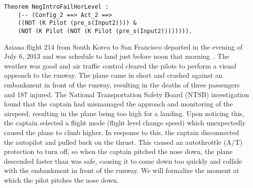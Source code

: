 \begin{tcolorbox}\begin{lstlisting}[language=Coq]
Theorem NegIntroFailHorLevel : 
	|-- (Config_2 ==> Act_2 ==>
	((NOT (K Pilot (pre_s(Input2)))) & 
	(NOT (K Pilot (NOT (K Pilot (pre_s(Input2)))))))).
	\end{lstlisting}
\end{tcolorbox}

Asiana flight 214 from South Korea to San Francisco departed in the evening of July 6, 2013 and was schedule to land just before noon that morning~\cite{asiana}. The weather was good and air traffic control cleared the pilots to perform a visual approach to the runway. The plane came in short and crashed against an embankment in front of the runway, resulting in the deaths of three passengers and 187 injured. The National Transportation Safety Board (NTSB) investigation found that the captain had mismanaged the approach and monitoring of the airspeed, resulting in the plane being too high for a landing. Upon noticing this, the captain selected a flight mode (flight level change speed) which unexpectedly caused the plane to climb higher. In response to this, the captain disconnected the autopilot and pulled back on the thrust. This caused an autothrottle (A/T) protection to turn off, so when the captain pitched the nose down, the plane descended faster than was safe, causing it to come down too quickly and collide with the embankment in front of the runway. We will formalize the moment at which the pilot pitches the nose down. 

